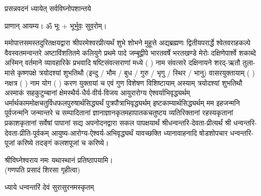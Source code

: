 
\setlength{\parindent}{0pt}




{प्रसन्नवदनं ध्यायेत् सर्वविघ्नोपशान्तये}
 
प्राणान्  आयम्य।  ॐ भूः + भूर्भुवः॒ सुव॒रोम्।


ममोपात्तसमस्तदुरितक्षयद्वारा श्रीपरमेश्वरप्रीत्यर्थं शुभे शोभने मुहूत्ते अद्यब्रह्मणः
द्वितीयपरार्द्धे श्वेतवराहकल्पे वैवस्वतमन्वन्तरे अष्टाविंशतितमे कलियुगे प्रथमे पादे
जम्बूद्वीपे भारतवर्षे भरतखण्डे मेरोः दक्षिणेपार्श्वे शकाब्दे अस्मिन् वर्तमाने व्यावहारिके
 प्रभवादि षष्टिसंवत्सराणां मध्ये (  ) नाम संवत्सरे दक्षिनायने 
शरद्-ऋतौ  तुला-मासे कृष्णपक्षे त्रयोदश्यां शुभतिथौ
(इन्दु / भौम / बुध / गुरु / भृगु / स्थिर / भानु) वासरयुक्तायाम्
(  ) नक्षत्र (  ) नाम  योग  (  ) करण युक्तायां च एवं गुण विशेषण विशिष्टायाम्
अस्याम् त्रयोदश्यां शुभतिथौ 
अस्माकं सहकुटुम्बानां क्षेमस्थैर्य-धैर्य-वीर्य-विजय आयुरारोग्य ऐश्वर्याभिवृद्ध्यर्थम्
 धर्मार्थकाममोक्ष\-चतुर्विधफलपुरुषार्थसिद्ध्यर्थं पुत्रपौत्राभि\-वृद्ध्यर्थम् इष्टकाम्यार्थसिद्ध्यर्थम्
मम इहजन्मनि पूर्वजन्मनि जन्मान्तरे च सम्पादितानां ज्ञानाज्ञानकृतमहा\-पातकचतुष्टय
व्यतिरिक्तानां रहस्यकृतानां प्रकाशकृतानां सर्वेषां पापानां सद्य अपनोदनद्वारा सकल 
पापक्षयार्थं
श्रीधन्वन्तरि-देवता-प्रीत्यर्थं श्री धन्वन्तरि-देवता-प्रीति-पूर्वकम् आयुष्य-आरोग्य-ऐश्वर्य-अभिवृद्ध्यर्थं 
यावच्छक्ति ध्यानावाहनादि 
षोडशोपचार धन्वन्तरि-पूजां करिष्ये तदङ्गं कलशपूजां च करिष्ये।


श्रीविघ्नेश्वराय नमः यथास्थानं प्रतिष्ठापयामि।\\
(गणपति प्रसादं शिरसा गृहीत्वा)













\centering

{ध्याये धन्वन्तरिं देवं सुरासुरनमस्कृतम्}

